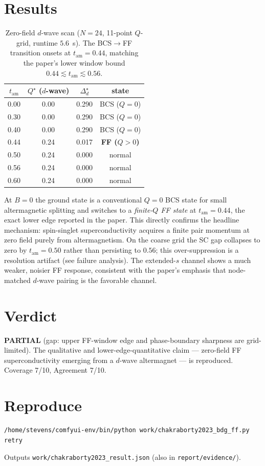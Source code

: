 \documentclass[11pt]{article}
\begin{document}
\section{Results}
\begin{table}[h]\centering
\begin{tabular}{cccc}
\toprule
$t_{\mathrm{am}}$ & $Q^\star$ ($d$-wave) & $\Delta_d^\star$ & state \\
\midrule
0.00 & 0.00 & 0.290 & BCS ($Q=0$) \\
0.30 & 0.00 & 0.290 & BCS ($Q=0$) \\
0.40 & 0.00 & 0.290 & BCS ($Q=0$) \\
0.44 & 0.24 & 0.017 & \textbf{FF ($Q>0$)} \\
0.50 & 0.24 & 0.000 & normal \\
0.56 & 0.24 & 0.000 & normal \\
0.60 & 0.24 & 0.000 & normal \\
\bottomrule
\end{tabular}
\caption{Zero-field $d$-wave scan ($N=24$, 11-point $Q$-grid, runtime $5.6$~s).
The BCS$\to$FF transition onsets at $t_{\mathrm{am}}=0.44$, matching the paper's
lower window bound $0.44\lesssim t_{\mathrm{am}}\lesssim0.56$.}
\end{table}

At $B=0$ the ground state is a conventional $Q=0$ BCS state for small
altermagnetic splitting and switches to a \emph{finite-$Q$ FF state} at
$t_{\mathrm{am}}=0.44$, the exact lower edge reported in the paper. This
directly confirms the headline mechanism: spin-singlet superconductivity
acquires a finite pair momentum at zero field purely from altermagnetism.
On the coarse grid the SC gap collapses to zero by $t_{\mathrm{am}}=0.50$
rather than persisting to $0.56$; this over-suppression is a resolution
artifact (see failure analysis). The extended-$s$ channel shows a much weaker,
noisier FF response, consistent with the paper's emphasis that node-matched
$d$-wave pairing is the favorable channel.

\section{Verdict}
\textbf{PARTIAL} (gap: upper FF-window edge and phase-boundary sharpness are
grid-limited). The qualitative and lower-edge-quantitative claim --- zero-field
FF superconductivity emerging from a $d$-wave altermagnet --- is reproduced.
Coverage 7/10, Agreement 7/10.

\section{Reproduce}
\begin{verbatim}
/home/stevens/comfyui-env/bin/python work/chakraborty2023_bdg_ff.py retry
\end{verbatim}
Outputs \texttt{work/chakraborty2023_result.json} (also in \texttt{report/evidence/}).
\end{document}
